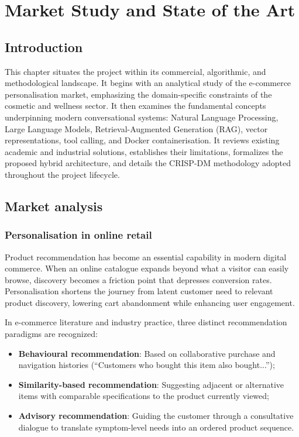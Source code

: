 ﻿%

\chapter{Market Study and State of the Art}

\section{Introduction}

This chapter situates the project within its commercial, algorithmic, and methodological landscape. It begins with an analytical study of the e-commerce personalisation market, emphasizing the domain-specific constraints of the cosmetic and wellness sector. It then examines the fundamental concepts underpinning modern conversational systems: Natural Language Processing, Large Language Models, Retrieval-Augmented Generation (RAG), vector representations, tool calling, and Docker containerisation. It reviews existing academic and industrial solutions, establishes their limitations, formalizes the proposed hybrid architecture, and details the CRISP-DM methodology adopted throughout the project lifecycle.

\section{Market analysis}

\subsection{Personalisation in online retail}

Product recommendation has become an essential capability in modern digital commerce. When an online catalogue expands beyond what a visitor can easily browse, discovery becomes a friction point that depresses conversion rates. Personalisation shortens the journey from latent customer need to relevant product discovery, lowering cart abandonment while enhancing user engagement.

In e-commerce literature and industry practice, three distinct recommendation paradigms are recognized:
\begin{itemize}
  \item \textbf{Behavioural recommendation}: Based on collaborative purchase and navigation histories (``Customers who bought this item also bought...'');
  \item \textbf{Similarity-based recommendation}: Suggesting adjacent or alternative items with comparable specifications to the product currently viewed;
  \item \textbf{Advisory recommendation}: Guiding the customer through a consultative dialogue to translate symptom-level needs into an ordered product sequence.
\end{itemize}

